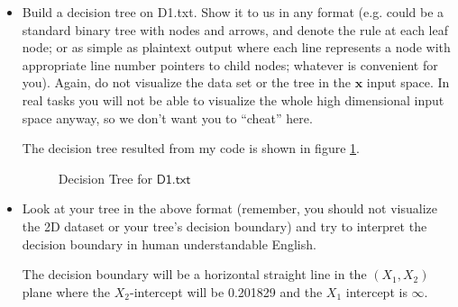 \documentclass[a4paper]{article}
\theoremstyle{definition}
\def\x{\mathbf x}
\newenvironment{soln}{
    \leavevmode\color{blue}\ignorespaces
}{}
\begin{document}
\begin{enumerate}
\begin{itemize}
  \item Build a decision tree on D1.txt.  Show it to us in any format (e.g. could be a standard binary tree with nodes and arrows, and denote the rule at each leaf node; or as simple as plaintext output where each line represents a node with appropriate line number pointers to child nodes; whatever is convenient for you). Again, do not visualize the data set or the tree in the $\x$ input space.  In real tasks you will not be able to visualize the whole high dimensional input space anyway, so we don't want you to ``cheat'' here. 

  \begin{soln}
      The decision tree resulted from my code is shown in figure \ref{fig:3}.

      \begin{figure}[H]
          \centering
          \caption{Decision Tree for $\mathsf{D1.txt}$}
          \label{fig:3}
      \end{figure}
  \end{soln}
  
  \item Look at your tree in the above format (remember, you should not visualize the 2D dataset or your tree's decision boundary) and try to interpret the decision boundary in human understandable English.
  \begin{soln}
      The decision boundary will be a horizontal straight line in the $(X_1, X_2)$ plane where the $X_2$-intercept will be 0.201829 and the $X_1$ intercept is $\infty$.
  \end{soln}
  

\end{itemize}
\end{enumerate}
\end{document}
